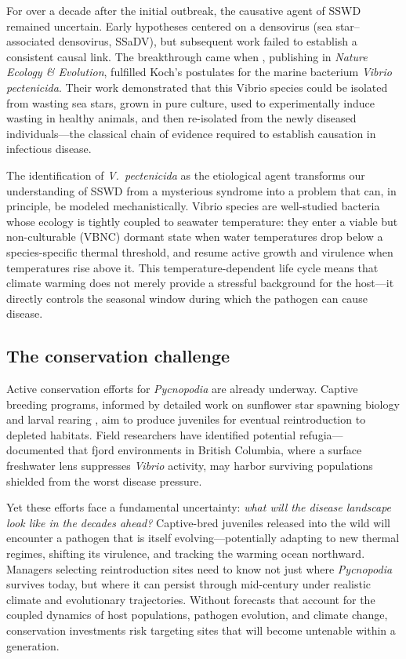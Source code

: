 For over a decade after the initial outbreak, the causative agent of SSWD remained
uncertain. Early hypotheses centered on a densovirus (sea star--associated
densovirus, SSaDV), but subsequent work failed to establish a consistent causal
link. The breakthrough came when \citet{prentice2025}, publishing in \textit{Nature
Ecology \& Evolution}, fulfilled Koch's postulates for the marine bacterium
\textit{Vibrio pectenicida}. Their work demonstrated that this Vibrio species could
be isolated from wasting sea stars, grown in pure culture, used to experimentally
induce wasting in healthy animals, and then re-isolated from the newly diseased
individuals---the classical chain of evidence required to establish causation in
infectious disease.

The identification of \textit{V.\ pectenicida} as the etiological agent transforms our
understanding of SSWD from a mysterious syndrome into a problem that can, in
principle, be modeled mechanistically. Vibrio species are well-studied bacteria
whose ecology is tightly coupled to seawater temperature: they enter a viable but
non-culturable (VBNC) dormant state when water temperatures drop below a
species-specific thermal threshold, and resume active growth and virulence when
temperatures rise above it. This temperature-dependent life cycle means that climate
warming does not merely provide a stressful background for the host---it directly
controls the seasonal window during which the pathogen can cause disease.

\subsection{The conservation challenge}

Active conservation efforts for \textit{Pycnopodia} are already underway. Captive
breeding programs, informed by detailed work on sunflower star spawning biology and
larval rearing \citep{hodin2021}, aim to produce juveniles for eventual
reintroduction to depleted habitats. Field researchers have identified potential
refugia---\citet{gehman2025} documented that fjord environments in British Columbia,
where a surface freshwater lens suppresses \textit{Vibrio} activity, may harbor
surviving populations shielded from the worst disease pressure.

Yet these efforts face a fundamental uncertainty: \textit{what will the disease
landscape look like in the decades ahead?} Captive-bred juveniles released into the
wild will encounter a pathogen that is itself evolving---potentially adapting to new
thermal regimes, shifting its virulence, and tracking the warming ocean northward.
Managers selecting reintroduction sites need to know not just where \textit{Pycnopodia}
survives today, but where it can persist through mid-century under realistic climate
and evolutionary trajectories. Without forecasts that account for the coupled dynamics
of host populations, pathogen evolution, and climate change, conservation investments
risk targeting sites that will become untenable within a generation.

